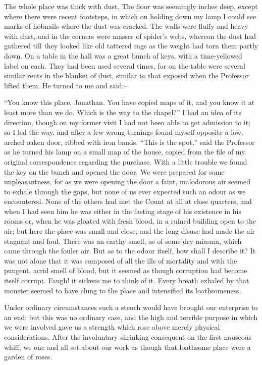 \documentclass[12pt,openright]{book}
\begin{document}
The whole place was thick with dust. The floor was seemingly inches deep, except where there were recent footsteps, in which on holding down my lamp I could see marks of hobnails where the dust was cracked. The walls were fluffy and heavy with dust, and in the corners were masses of spider’s webs, whereon the dust had gathered till they looked like old tattered rags as the weight had torn them partly down. On a table in the hall was a great bunch of keys, with a time-yellowed label on each. They had been used several times, for on the table were several similar rents in the blanket of dust, similar to that exposed when the Professor lifted them. He turned to me and said:–

“You know this place, Jonathan. You have copied maps of it, and you know it at least more than we do. Which is the way to the chapel?” I had an idea of its direction, though on my former visit I had not been able to get admission to it; so I led the way, and after a few wrong turnings found myself opposite a low, arched oaken door, ribbed with iron bands. “This is the spot,” said the Professor as he turned his lamp on a small map of the house, copied from the file of my original correspondence regarding the purchase. With a little trouble we found the key on the bunch and opened the door. We were prepared for some unpleasantness, for as we were opening the door a faint, malodorous air seemed to exhale through the gaps, but none of us ever expected such an odour as we encountered. None of the others had met the Count at all at close quarters, and when I had seen him he was either in the fasting stage of his existence in his rooms or, when he was gloated with fresh blood, in a ruined building open to the air; but here the place was small and close, and the long disuse had made the air stagnant and foul. There was an earthy smell, as of some dry miasma, which came through the fouler air. But as to the odour itself, how shall I describe it? It was not alone that it was composed of all the ills of mortality and with the pungent, acrid smell of blood, but it seemed as though corruption had become itself corrupt. Faugh! it sickens me to think of it. Every breath exhaled by that monster seemed to have clung to the place and intensified its loathsomeness.

Under ordinary circumstances such a stench would have brought our enterprise to an end; but this was no ordinary case, and the high and terrible purpose in which we were involved gave us a strength which rose above merely physical considerations. After the involuntary shrinking consequent on the first nauseous whiff, we one and all set about our work as though that loathsome place were a garden of roses.
\end{document}
